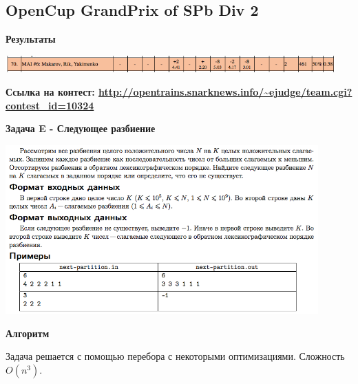 \documentclass[a4paper,12pt]{article}
\begin{document}
\newpage
\subsection{OpenCup GrandPrix of SPb Div 2}

\textbf{{\large Результаты}} \\
\begin{center}
\includegraphics[width=0.95\textwidth]{OC_SPB/result.png}\\ [1cm]
\end{center}

\textbf{{\large Ссылка на контест: \url{http://opentrains.snarknews.info/~ejudge/team.cgi?contest_id=10324}}}

\newpage
\textbf{{\large Задача E - Следующее разбиение}}

\begin{center}
\includegraphics[width=0.9\textwidth]{OC_SPB/E.png}\\ [1cm]
\end{center}

\textbf{{\large Алгоритм}}

Задача решается с помощью перебора с некоторыми оптимизациями. Сложность $O(n^3)$. \\
\end{document}
